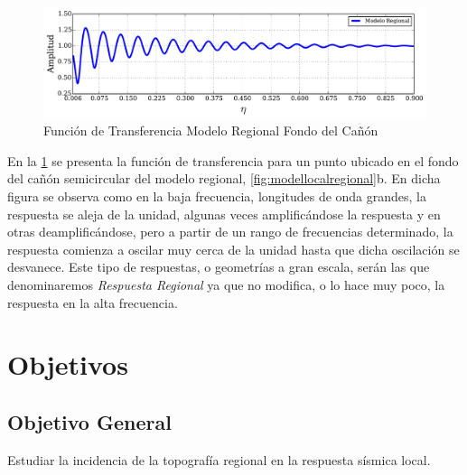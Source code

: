 \documentclass[spanish,letterpaper,12pt,twoside,openany]{article}
\begin{document}
\begin{figure}[H]
	\centering
	\includegraphics[width=15.5 cm]{img/RegionalResponse.pdf}
	\vspace{-1 cm}
	\caption{Función de Transferencia Modelo Regional Fondo del Cañón}
	\label{fig:regionalresponse}
	\vspace{-1 cm}
\end{figure}

En la \cref{fig:regionalresponse} se presenta la función de transferencia para un punto ubicado en el fondo del cañón semicircular del modelo regional, \cref{fig:modellocalregional}b. En dicha figura se observa como en la baja frecuencia, longitudes de onda grandes, la respuesta se aleja de la unidad, algunas veces amplificándose la respuesta y en otras deamplificándose, pero a partir de un rango de frecuencias determinado, la respuesta comienza a oscilar muy cerca de la unidad hasta que dicha oscilación se desvanece. Este tipo de respuestas, o geometrías a gran escala, serán las que denominaremos \textit{Respuesta Regional} ya que no modifica, o lo hace muy poco, la respuesta en la alta frecuencia.
%
%
%
%
%
\section{Objetivos}
%
\subsection{Objetivo General}
%
Estudiar la incidencia de la topografía regional en la respuesta sísmica local.
%
\end{document}
